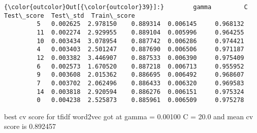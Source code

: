 \documentclass[11pt]{article}
\begin{document}
\begin{Verbatim}[commandchars=\\\{\}]
{\color{outcolor}Out[{\color{outcolor}39}]:}        gamma         C  Test\_score  Test\_std  Train\_score
         5   0.002625  2.978150    0.889314  0.006145     0.968132
         11  0.002274  2.929955    0.889104  0.005996     0.964255
         10  0.003434  3.078954    0.887742  0.006286     0.974421
         4   0.003403  2.501247    0.887690  0.006506     0.971187
         12  0.003382  3.446907    0.887533  0.006390     0.975409
         6   0.002573  1.670520    0.887218  0.006713     0.955952
         9   0.003608  2.015362    0.886695  0.006492     0.968607
         7   0.003702  2.062496    0.886433  0.006320     0.969583
         14  0.003818  2.920594    0.886276  0.006151     0.975324
         0   0.004238  2.525873    0.885961  0.006509     0.975278
\end{Verbatim}
            
    best cv score for tfidf word2vec got at gamma = 0.00100 C = 20.0 and
mean cv score is 0.892457
\end{document}
